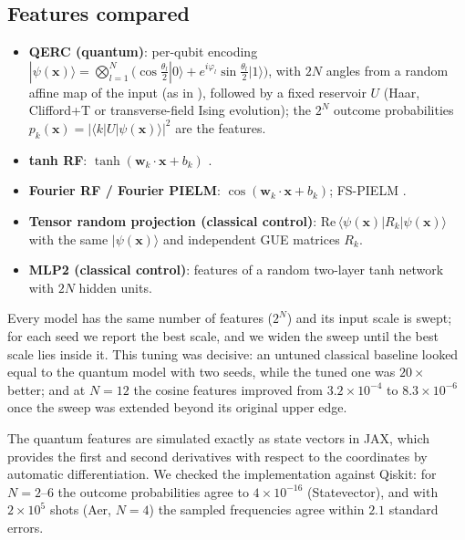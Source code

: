 \documentclass[11pt]{article}
\theoremstyle{remark}\newtheorem*{remark}{Remark}
\begin{document}
\subsection{Features compared}
\begin{itemize}
  \item \textbf{QERC (quantum)}: per-qubit encoding $|\psi(\bm x)\rangle=\bigotimes_{l=1}^N
        \big(\cos\tfrac{\theta_l}{2}|0\rangle+e^{i\varphi_l}\sin\tfrac{\theta_l}{2}|1\rangle\big)$,
        with $2N$ angles from a random affine map of the input (as in \citet{ikeda2026qerc}),
        followed by a fixed reservoir $U$ (Haar, Clifford+T or transverse-field Ising evolution);
        the $2^N$ outcome probabilities $p_k(\bm x)=|\langle k|U|\psi(\bm x)\rangle|^2$ are the features.
  \item \textbf{tanh RF}: $\tanh(\bm w_k\cdot\bm x+b_k)$ \citep{rahimi2007rf}.
  \item \textbf{Fourier RF / Fourier PIELM}: $\cos(\bm w_k\cdot\bm x+b_k)$; FS-PIELM \citep{fspielm2026}.
  \item \textbf{Tensor random projection (classical control)}: $\mathrm{Re}\,\langle\psi(\bm x)|R_k|\psi(\bm x)\rangle$
        with the same $|\psi(\bm x)\rangle$ and independent GUE matrices $R_k$.
  \item \textbf{MLP2 (classical control)}: features of a random two-layer tanh network with $2N$ hidden units.
\end{itemize}
Every model has the same number of features ($2^N$) and its input scale is swept; for each seed we report the
best scale, and we widen the sweep until the best scale lies inside it. This tuning was decisive: an untuned
classical baseline looked equal to the quantum model with two seeds, while the tuned one was $20\times$ better;
and at $N=12$ the cosine features improved from $3.2\times10^{-4}$ to $8.3\times10^{-6}$ once the sweep was
extended beyond its original upper edge.

The quantum features are simulated exactly as state vectors in JAX, which provides the first and second
derivatives with respect to the coordinates by automatic differentiation. We checked the implementation against
Qiskit: for $N=2$--$6$ the outcome probabilities agree to $4\times10^{-16}$ (Statevector), and with $2\times10^5$
shots (Aer, $N=4$) the sampled frequencies agree within $2.1$ standard errors.

\end{document}
